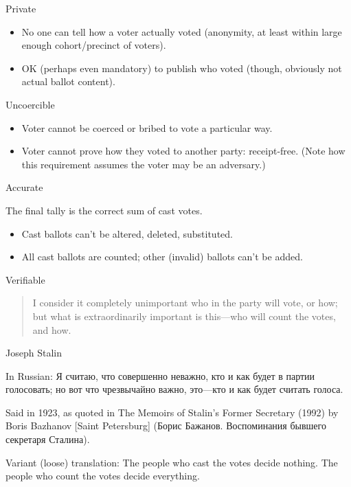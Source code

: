 \documentclass[utf8]{beamer}
\begin{document}
\begin{frame}{Private}

  \begin{itemize}
  \item No one can tell how a voter actually voted (anonymity, at
    least within large enough cohort/precinct of voters).
  \item OK (perhaps even mandatory) to publish who voted (though,
    obviously not actual ballot content).
  \end{itemize}

\end{frame}

\begin{frame}{Uncoercible}

  \begin{itemize}
  \item Voter cannot be coerced or bribed to vote a particular way.
  \item Voter cannot prove how they voted to another party:
    receipt-free. (Note how this requirement assumes the voter may be
    an adversary.)
  \end{itemize}
  
\end{frame}

\begin{frame}{Accurate}

  The final tally is the correct sum of cast votes.
  \begin{itemize}
    \item Cast ballots can't be altered, deleted, substituted.
    \item All cast ballots are counted; other (invalid) ballots can't
      be added.
    \end{itemize}
  
\end{frame}

\begin{frame}{Verifiable}

  \begin{quote}
  I consider it completely unimportant who in the party
  will vote, or how; but what is extraordinarily important is
  this---who will count the votes, and how. 
  \end{quote}
  Joseph Stalin 

  In Russian: Я считаю, что совершенно неважно, кто и как будет в
  партии голосовать; но вот что чрезвычайно важно, это---кто и как
  будет считать голоса. 

  Said in 1923, as quoted in The Memoirs of Stalin's Former Secretary
  (1992) by Boris Bazhanov [Saint Petersburg] (Борис Бажанов.
  Воспоминания бывшего секретаря Сталина). 

  Variant (loose) translation: The people who cast the votes decide
  nothing. The people who count the votes decide everything.

\end{frame}
\end{document}
